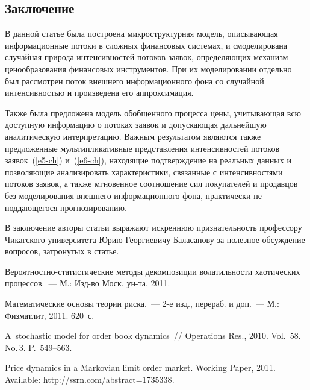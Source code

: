 \begin{multicols}{2}

\section{Заключение}

В данной статье была построена микроструктурная модель, описывающая
информационные потоки в сложных финансовых системах, и смоделирована
случайная природа интенсивностей потоков заявок, определяющих
механизм ценообразования финансовых инструментов. При их
моделировании отдельно был рассмотрен поток внешнего информационного
фона со случайной интенсивностью и произведена его аппроксимация.

Также была предложена модель обобщенного процесса цены, учитывающая
всю доступную информацию о потоках заявок и допускающая дальнейшую
аналитическую интерпретацию. Важным результатом являются также
предложенные мультипликативные пред\-став\-ле\-ния интенсивностей потоков
заявок~(\ref{e5-ch}) и~(\ref{e6-ch}), находящие подтверждение на реальных данных и
позволяющие анализировать характеристики, связанные с интенсивностями потоков заявок, 
а также мгновенное соотношение сил покупателей и продавцов без моделирования внешнего
информационного фона, практически не поддающегося прогнозированию.

В заключение авторы статьи выражают искреннюю признательность
профессору Чикагского университета Юрию Георгиевичу Баласанову за
полезное обсуждение вопросов, затронутых в статье.

{\small\frenchspacing
{%
\begin{thebibliography}{99}



 Ве\-ро\-ят\-ност\-но-ста\-ти\-сти\-че\-ские методы декомпозиции
волатильности хаотических процессов.~--- М.: Изд-во Моск. ун-та, 2011.

Математические основы теории риска.~--- 2-е изд., перераб. и доп.~--- М.: Физматлит, 2011. 620~с.

 A~stochastic model for order book dynamics~//
Operations Res., 2010. Vol.~58. No.\,3. P.~549--563.

Price dynamics in a Markovian limit order
market. Working Paper, 2011. Available: {\sf http://ssrn.com/abstract=1735338}.


\end{thebibliography}}}
\end{multicols}
